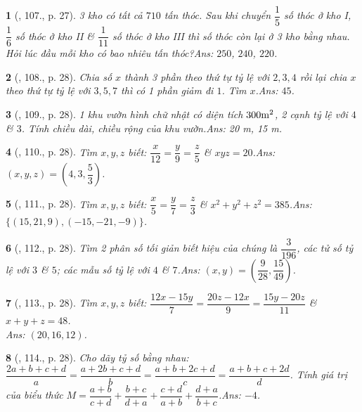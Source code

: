\documentclass{article}
\newtheorem{baitoan}{}
\begin{document}
\begin{baitoan}[\cite{Tuyen_Toan_7}, 107., p. 27]
	3 kho có tất cả $710$ tấn thóc. Sau khi chuyển $\dfrac{1}{5}$ số thóc ở kho I, $\dfrac{1}{6}$ số thóc ở kho II \& $\dfrac{1}{11}$ số thóc ở kho III thì số thóc còn lại ở 3 kho bằng nhau. Hỏi lúc đầu mỗi kho có bao nhiêu tấn thóc?\hfill{\sf Ans:} $250$, $240$, $220$.
\end{baitoan}

\begin{baitoan}[\cite{Tuyen_Toan_7}, 108., p. 28]
	Chia số $x$ thành 3 phần theo thứ tự tỷ lệ với $2,3,4$ rồi lại chia $x$ theo thứ tự tỷ lệ với $3,5,7$ thì có 1 phần giảm đi $1$. Tìm $x$.\hfill{\sf Ans:} $45$.
\end{baitoan}

\begin{baitoan}[\cite{Tuyen_Toan_7}, 109., p. 28]
	1 khu vườn hình chữ nhật có diện tích $\rm300m^2$, 2 cạnh tỷ lệ với $4$ \& $3$. Tính chiều dài, chiều rộng của khu vườn.\hfill{\sf Ans:} {\rm20 m, 15 m}.
\end{baitoan}

\begin{baitoan}[\cite{Tuyen_Toan_7}, 110., p. 28]
	Tìm $x,y,z$ biết: $\dfrac{x}{12} = \dfrac{y}{9} = \dfrac{z}{5}$ \& $xyz = 20$.\hfill{\sf Ans:} $(x,y,z) = \left(4,3,\dfrac{5}{3}\right)$.
\end{baitoan}

\begin{baitoan}[\cite{Tuyen_Toan_7}, 111., p. 28]
	Tìm $x,y,z$ biết: $\dfrac{x}{5} = \dfrac{y}{7} = \dfrac{z}{3}$ \& $x^2 + y^2 + z^2 = 385$.\hfill{\sf Ans:} $\{(15,21,9),(-15,-21,-9)\}$.
\end{baitoan}

\begin{baitoan}[\cite{Tuyen_Toan_7}, 112., p. 28]
	Tìm 2 phân số tối giản biết hiệu của chúng là $\dfrac{3}{196}$, các tử số tỷ lệ với $3$ \& $5$; các mẫu số tỷ lệ với $4$ \& $7$.\hfill{\sf Ans:} $(x,y) = \left(\dfrac{9}{28},\dfrac{15}{49}\right)$.
\end{baitoan}

\begin{baitoan}[\cite{Tuyen_Toan_7}, 113., p. 28]
	Tìm $x,y,z$ biết: $\dfrac{12x - 15y}{7} = \dfrac{20z - 12x}{9} = \dfrac{15y - 20z}{11}$ \& $x + y + z = 48$.\\\mbox{}\hfill{\sf Ans:} $(20,16,12)$.
\end{baitoan}

\begin{baitoan}[\cite{Tuyen_Toan_7}, 114., p. 28]
	Cho dãy tỷ số bằng nhau: $\dfrac{2a + b + c + d}{a} = \dfrac{a + 2b + c + d}{b} = \dfrac{a + b + 2c + d}{c} = \dfrac{a + b + c + 2d}{d}$. Tính giá trị của biểu thức $M = \dfrac{a + b}{c + d} + \dfrac{b + c}{d + a} + \dfrac{c + d}{a + b} + \dfrac{d + a}{b + c}$.\hfill{\sf Ans:} $-4$.
\end{baitoan}
\end{document}
